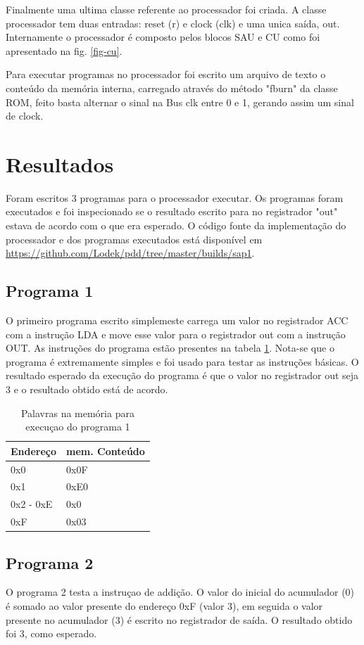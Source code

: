 \documentclass[11pt, twocolumn]{article}
\begin{document}
Finalmente uma ultima classe referente ao processador foi criada.
A classe processador tem duas entradas: reset (r) e clock (clk) e uma unica saída, out. Internamente o processador é composto pelos blocos SAU e CU como foi apresentado na fig. \ref{fig-cu}. 

Para executar programas no processador foi escrito um arquivo de texto o conteúdo da memória interna, carregado através do método "fburn" da classe ROM, feito basta alternar o sinal na Bus clk entre 0 e 1, gerando assim um sinal de clock.

\section{Resultados}

Foram escritos 3 programas para o processador executar.
Os programas foram executados e foi inspecionado se o resultado escrito para no registrador "out" estava de acordo com o que era esperado.
O código fonte da implementação do processador e dos programas executados está disponível em \url{https://github.com/Lodek/pdd/tree/master/builds/sap1}.

\subsection{Programa 1}
O primeiro programa escrito simplemeste carrega um valor no registrador ACC com a instrução LDA e move esse valor para o registrador out com a instrução OUT.
As instruções do programa estão presentes na tabela \ref{tab-p1}. Nota-se que o programa é extremamente simples e foi usado para testar as instruções básicas.
O resultado esperado da execução do programa é que o valor no registrador out seja 3 e o resultado obtido está de acordo.

\begin{table}
  \caption{Palavras na memória para execuçao do programa 1}
\begin{tabular}{ll}
  \hline
  Endereço & mem. Conteúdo \\
  \hline
  0x0 & 0x0F \\
  0x1 & 0xE0 \\
  0x2 - 0xE & 0x0 \\
  0xF & 0x03 \\
  \hline
  \end{tabular}
\label{tab-p1}
\end{table}

\subsection{Programa 2}
O programa 2 testa a instruçao de addição.
O valor do inicial do acumulador (0) é somado ao valor presente do endereço 0xF (valor 3), em seguida o valor presente no acumulador (3) é escrito no registrador de saída.
O resultado obtido foi $3$, como esperado.
\end{document}
